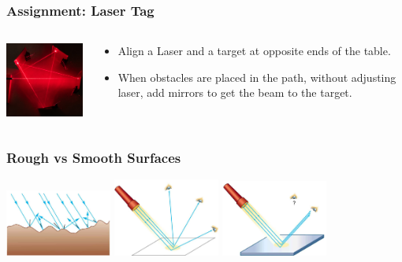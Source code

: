 \documentclass{beamer}
\begin{document}
\begin{frame}\frametitle{Assignment: Laser Tag}
\begin{columns}
\begin{column}{5cm}
\begin{center}
\includegraphics[width=4.5cm]{fig/lasertag.jpg}
\end{center}
\end{column}
\begin{column}{7cm}
\begin{itemize}
\item Align a Laser and a target at opposite ends of the table.
\item When obstacles are placed in the path, without adjusting laser, add mirrors to get the beam to the target.
\end{itemize}
\end{column}

\end{columns}
\end{frame}




\begin{frame}\frametitle{Rough vs Smooth Surfaces}

\begin{center}
\includegraphics[width=3.5cm]{fig/reflect_rough.png}
\includegraphics[width=3.5cm]{fig/reflect_paper.png}
\includegraphics[width=3.5cm]{fig/reflect_mirror.png}
\end{center}

\end{frame}
\end{document}
